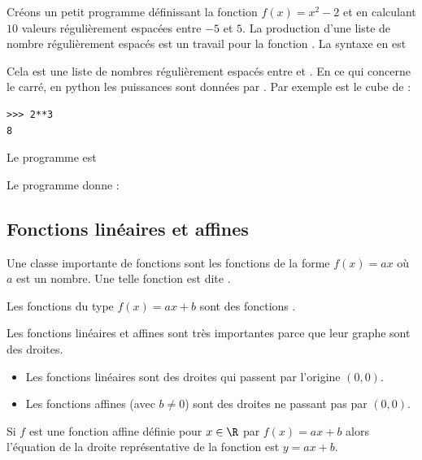 \begin{example}
    Créons un petit programme définissant la fonction \( f(x)=x^2-2\) et en calculant \( 10\) valeurs régulièrement espacées entre \( -5\) et \( 5\). La production d'une liste de nombre régulièrement espacés est un travail pour la fonction . La syntaxe en est 
\begin{quote}
\end{quote}
Cela est une liste de  nombres régulièrement espacés entre  et . En ce qui concerne le carré, en python les puissances sont données par \info{**}. Par exemple  est le cube de  :
\begin{verbatim}
>>> 2**3
8
\end{verbatim}
Le programme est



Le programme donne :


    
\end{example}

\subsection{Fonctions linéaires et affines}

\begin{definition}
    Une classe importante de fonctions sont les fonctions de la forme \( f(x)=ax\) où \( a\) est un nombre. Une telle fonction est dite . 

    Les fonctions du type \( f(x)=ax+b\) sont des fonctions . 
\end{definition}


\begin{Aretenir}
    Les fonctions linéaires et affines sont très importantes parce que leur graphe sont des droites. 
    \begin{itemize}
        \item 
    Les fonctions linéaires sont des droites qui passent par l'origine \( (0,0)\).
    \item
    Les fonctions affines (avec \( b\neq 0\)) sont des droites ne passant pas par \( (0,0)\).
    \end{itemize}
\end{Aretenir}
Si $f$ est une fonction affine définie pour $x\in\R$ par $f(x)=ax+b$ alors l'équation de la droite représentative de la fonction est $y=ax+b$. 

